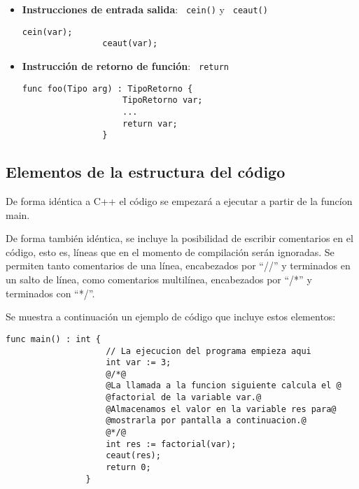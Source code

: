 \documentclass[10pt,a4paper]{article}
\begin{document}
\begin{itemize}
    \item \textbf{Instrucciones de entrada salida}: \texttt{\color{blue} cein()} y \texttt{\color{blue} ceaut()}
    \begin{center}
        \begin{minipage}{\linewidth}
            \begin{lstlisting}[linewidth=0.3\linewidth, gobble=16]
                cein(var);
                ceaut(var);
            \end{lstlisting}
        \end{minipage}
    \end{center}
    
    \item \textbf{Instrucción de retorno de función}: \texttt{\color{blue} return}
    \begin{center}
        \begin{minipage}{\linewidth}
            \begin{lstlisting}[linewidth=0.3\linewidth, gobble=16]
                func foo(Tipo arg) : TipoRetorno {
                    TipoRetorno var;
                    ...
                    return var;
                }
            \end{lstlisting}
        \end{minipage}
    \end{center}

\end{itemize}

\subsection{Elementos de la estructura del código}
De forma idéntica a C++ el código se empezará a ejecutar a partir de la funcíon main.

De forma también idéntica, se incluye la posibilidad de escribir comentarios en el código, esto es, líneas que en el momento de compilación serán ignoradas. Se permiten tanto comentarios de una línea, encabezados por ``//'' y terminados en un salto de línea, como comentarios multilínea, encabezados por ``/*'' y terminados con ``*/''.

Se muestra a continuación un ejemplo de código que incluye estos elementos:

\begin{center}
    \begin{minipage}{\linewidth}
        \begin{lstlisting}[linewidth=0.7\linewidth, gobble=16]
                func main() : int {
                    // La ejecucion del programa empieza aqui
                    int var := 3;
                    @/*@
                    @La llamada a la funcion siguiente calcula el @
                    @factorial de la variable var.@
                    @Almacenamos el valor en la variable res para@
                    @mostrarla por pantalla a continuacion.@
                    @*/@
                    int res := factorial(var);
                    ceaut(res);
                    return 0;
                }
        \end{lstlisting}
    \end{minipage}
\end{center}
\end{document}
